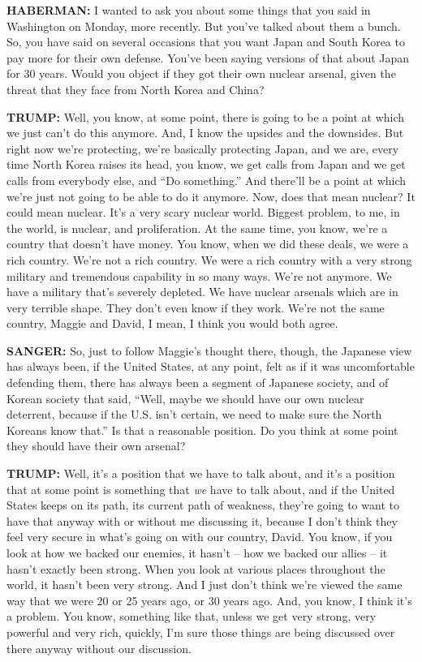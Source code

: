 \textbf{HABERMAN:} I wanted to ask you about some things that you said
in Washington on Monday, more recently. But you've talked about them a
bunch. So, you have said on several occasions that you want Japan and
South Korea to pay more for their own defense. You've been saying
versions of that about Japan for 30 years. Would you object if they got
their own nuclear arsenal, given the threat that they face from North
Korea and China?

\textbf{TRUMP:} Well, you know, at some point, there is going to be a
point at which we just can't do this anymore. And, I know the upsides
and the downsides. But right now we're protecting, we're basically
protecting Japan, and we are, every time North Korea raises its head,
you know, we get calls from Japan and we get calls from everybody else,
and ``Do something.'' And there'll be a point at which we're just not
going to be able to do it anymore. Now, does that mean nuclear? It could
mean nuclear. It's a very scary nuclear world. Biggest problem, to me,
in the world, is nuclear, and proliferation. At the same time, you know,
we're a country that doesn't have money. You know, when we did these
deals, we were a rich country. We're not a rich country. We were a rich
country with a very strong military and tremendous capability in so many
ways. We're not anymore. We have a military that's severely depleted. We
have nuclear arsenals which are in very terrible shape. They don't even
know if they work. We're not the same country, Maggie and David, I mean,
I think you would both agree.

\textbf{SANGER:} So, just to follow Maggie's thought there, though, the
Japanese view has always been, if the United States, at any point, felt
as if it was uncomfortable defending them, there has always been a
segment of Japanese society, and of Korean society that said, ``Well,
maybe we should have our own nuclear deterrent, because if the U.S.
isn't certain, we need to make sure the North Koreans know that.'' Is
that a reasonable position. Do you think at some point they should have
their own arsenal?

\textbf{TRUMP:} Well, it's a position that we have to talk about, and
it's a position that at some point is something that \emph{we} have to
talk about, and if the United States keeps on its path, its current path
of weakness, they're going to want to have that anyway with or without
me discussing it, because I don't think they feel very secure in what's
going on with our country, David. You know, if you look at how we backed
our enemies, it hasn't -- how we backed our allies -- it hasn't exactly
been strong. When you look at various places throughout the world, it
hasn't been very strong. And I just don't think we're viewed the same
way that we were 20 or 25 years ago, or 30 years ago. And, you know, I
think it's a problem. You know, something like that, unless we get very
strong, very powerful and very rich, quickly, I'm sure those things are
being discussed over there anyway without our discussion.

